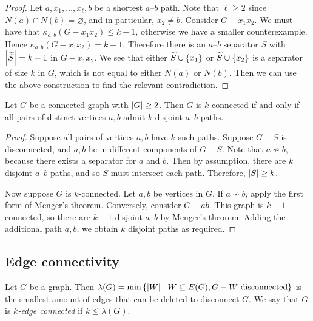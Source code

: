 \begin{proof}
	Let \( a, x_1, \dots, x_\ell, b \) be a shortest \( a \)--\( b \) path.
	Note that \( \ell \geq 2 \) since \( N(a) \cap N(b) = \varnothing \), and in particular, \( x_2 \neq b \).
	Consider \( G - x_1x_2 \).
	We must have that \( \kappa_{a,b}(G - x_1x_2) \leq k - 1 \), otherwise we have a smaller counterexample.
	Hence \( \kappa_{a,b}(G - x_1x_2) = k - 1 \).
	Therefore there is an \( a \)--\( b \) separator \( \widetilde S \) with \( \abs{\widetilde S} = k - 1 \) in \( G - x_1x_2 \).
	We see that either \( \widetilde S \cup \qty{x_1} \) or \( \widetilde S \cup \qty{x_2} \) is a separator of size \( k \) in \( G \), which is not equal to either \( N(a) \) or \( N(b) \).
	Then we can use the above construction to find the relevant contradiction.
\end{proof}
\begin{corollary}
	Let \( G \) be a connected graph with \( \abs{G} \geq 2 \).
	Then \( G \) is \( k \)-connected if and only if all pairs of distinct vertices \( a,b \) admit \( k \) disjoint \( a \)--\( b \) paths.
\end{corollary}
\begin{proof}
	Suppose all pairs of vertices \( a,b \) have \( k \) such paths.
	Suppose \( G - S \) is disconnected, and \( a, b \) lie in different components of \( G - S \).
	Note that \( a \not\sim b \), because there exists a separator for \( a \) and \( b \).
	Then by assumption, there are \( k \) disjoint \( a \)--\( b \) paths, and so \( S \) must intersect each path.
	Therefore, \( \abs{S} \geq k \).

	Now suppose \( G \) is \( k \)-connected.
	Let \( a, b \) be vertices in \( G \).
	If \( a \not\sim b \), apply the first form of Menger's theorem.
	Conversely, consider \( G - ab \).
	This graph is \( k - 1 \)-connected, so there are \( k - 1 \) disjoint \( a \)--\( b \) by Menger's theorem.
	Adding the additional path \( a, b \), we obtain \( k \) disjoint paths as required.
\end{proof}

\subsection{Edge connectivity}
\begin{definition}
	Let \( G \) be a graph.
	Then \( \lambda(G) = \min\qty{\abs{W} \mid W \subseteq E(G), G - W \text{ disconnected}} \) is the smallest amount of edges that can be deleted to disconnect \( G \).	
	We say that \( G \) is \emph{\( k \)-edge connected} if \( k \leq \lambda(G) \).
\end{definition}
